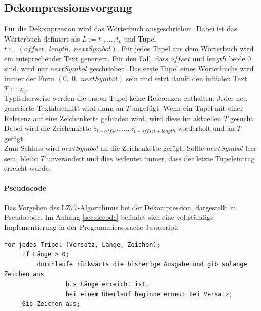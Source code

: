 \documentclass[10pt, a4paper]{article}
\begin{document}
\newpage
\subsection{Dekompressionsvorgang}
Für die Dekompression wird das Wörterbuch ausgeschrieben. Dabei ist das Wörterbuch definiert als $L:=t_1,...,t_k$ und Tupel $t:=(offset,\; length,\; nextSymbol)$. Für jedes Tupel aus dem Wörterbuch wird ein entsprechender Text generiert. Für den Fall, dass $offset$ und $length$ beide 0 sind, wird nur $nextSymbol$ geschrieben. Das erste Tupel eines Wörterbuchs wird immer der Form $(0,\; 0,\; nextSymbol)$ sein und setzt damit den initialen Text $T:=z_1$. \\

\noindent
Typischerweise werden die ersten Tupel keine Referenzen enthalten. Jeder neu generierte Textabschnitt wird dann an $T$ angefügt. Wenn ein Tupel mit einer Referenz auf eine Zeichenkette gefunden wird, wird diese im aktuellen $T$ gesucht. Dabei wird die Zeichenkette $z_{l-offset},...,z_{l-offset+length}$ wiederholt und an $T$ gefügt. \\

\noindent
Zum Schluss wird $nextSymbol$ an die Zeichenkette gefügt. Sollte $nextSymbol$ leer sein, bleibt $T$ unverändert und dies bedeutet immer, dass der letzte Tupeleintrag erreicht wurde. 

\vspace{5mm}
\paragraph{Pseudocode}
Das Vorgehen des LZ77-Algorithmus bei der Dekompression, dargestellt in Pseudocode. Im Anhang \ref{sec:decode} befindet sich eine vollständige Implementierung in der Programmiersprache Javascript.
\begin{verbatim}
for jedes Tripel (Versatz, Länge, Zeichen);
     if Länge > 0;
         durchlaufe rückwärts die bisherige Ausgabe und gib solange Zeichen aus
                 bis Länge erreicht ist,
                 bei einem Überlauf beginne erneut bei Versatz;
     Gib Zeichen aus;
\end{verbatim}

\vspace{5mm}
\end{document}
